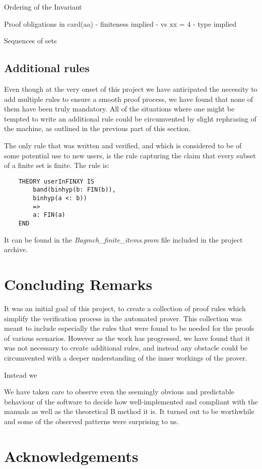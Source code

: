 \documentclass[11pt,journal]{IEEEtran}
\begin{document}
	Ordering of the Invariant
	
	Proof obligations in card(aa) - finiteness implied - vs xx = 4 - type implied
	
	Sequences of sets
	
	\subsection{Additional rules}
	Even though at the very onset of this project we have anticipated the necessity to add multiple rules to ensure a smooth proof process, we have found that none of them have been truly mandatory. All of the situations where one might be tempted to write an additional rule could be circumvented by slight rephrasing of the machine, as outlined in the previous part of this section.
	
	The only rule that was written and verified, and which is considered to be of some potential use to new users, is the rule capturing the claim that every subset of a finite set is finite. The rule is:
	\begin{lstlisting}
	THEORY userInFINXY IS
		band(binhyp(b: FIN(b)), 
		binhyp(a <: b))
		=>
		a: FIN(a)
	END
	\end{lstlisting}
	It can be found in the \emph{Bagmch\_finite\_items.pmm} file included in the project archive.
	
	
	\section{Concluding Remarks}

	It was an initial goal of this project, to create a collection of proof rules which simplify the verification process in the automated prover. This collection was meant to include especially the rules that were found to be needed for the proofs of various scenarios. However as the work has progressed, we have found that it was not necessary to create additional rules, and instead any obstacle could be circumvented with a deeper understanding of the inner workings of the prover.
	
	Instead we 
	
	We have taken care to observe even the seemingly obvious and predictable behaviour of the software to decide how well-implemented and compliant with the manuals as well as the theoretical B method it is. It turned out to be worthwhile and some of the observed patterns were surprising to us.

	
	\section{Acknowledgements}
	
\end{document}
